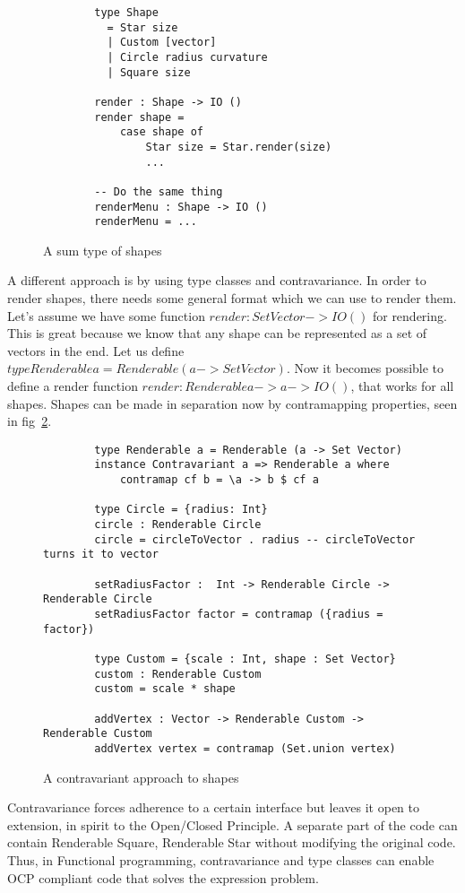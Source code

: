 \begin{figure}[H]
    \begin{lstlisting}
		type Shape 
          = Star size
		  | Custom [vector]
		  | Circle radius curvature
		  | Square size

		render : Shape -> IO ()
		render shape =
			case shape of
				Star size = Star.render(size)
                ...

		-- Do the same thing
		renderMenu : Shape -> IO ()
		renderMenu = ...
    \end{lstlisting}
    \caption{A sum type of shapes}
    \label{sumtypeshapes}
\end{figure}

A different approach is by using type classes and contravariance.  In order to
render shapes, there needs some general format which we can use to render them.
Let's assume we have some function $render : Set Vector -> IO ()$ for
rendering. This is great because we know that any shape can be represented as a
set of vectors in the end. Let us define $type Renderable a = Renderable (a ->
Set Vector)$. Now it becomes possible to define a render function $render :
Renderable a -> a -> IO ()$, that works for all shapes.  Shapes can be made in
separation now by contramapping properties, seen in fig~\ref{contracircle}.

\begin{figure}[H]
    \begin{lstlisting}
		type Renderable a = Renderable (a -> Set Vector)
		instance Contravariant a => Renderable a where
            contramap cf b = \a -> b $ cf a

		type Circle = {radius: Int}
        circle : Renderable Circle
        circle = circleToVector . radius -- circleToVector turns it to vector

        setRadiusFactor :  Int -> Renderable Circle -> Renderable Circle
        setRadiusFactor factor = contramap ({radius = factor})

		type Custom = {scale : Int, shape : Set Vector}
		custom : Renderable Custom
		custom = scale * shape

		addVertex : Vector -> Renderable Custom -> Renderable Custom
		addVertex vertex = contramap (Set.union vertex)
    \end{lstlisting}
    \caption{A contravariant approach to shapes}
    \label{contracircle}
\end{figure}

Contravariance forces adherence to a certain interface but leaves it open to
extension, in spirit to the Open/Closed Principle. A separate part of the
code can contain Renderable Square, Renderable Star without modifying the
original code. Thus, in Functional programming, contravariance and type classes
can enable OCP compliant code that solves the expression problem.











